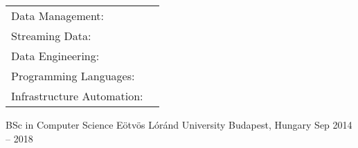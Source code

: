 \documentclass[]{awesome-cv}
\begin{document}
\begin{cventries}
	\cventry
	{}
	{\def\arraystretch{1.15}{\begin{tabular}{ l l }
		Data Management: & {\skill{ Snowflake, BigQuery, Redshift, SQL, DuckDB, Databricks, SQL, Data Lakes, Looker }} \\
		Streaming Data: & {\skill{ Kafka, Flink, Redpanda, Debezium, CDC, Materialize }} \\
		Data Engineering: & {\skill{ dbt, Airflow, Dagster, Fivetran, Meltano }} \\
		Programming Languages: & {\skill { Python, Go, Shell Scripting }} \\
		Infrastructure Automation: & {\skill{ GCP, AWS, Terraform, Docker, Kubernetes, CI/CD, GNU/Linux }} \\
		\end{tabular}}}
	{}
	{}
	{}
\end{cventries}

\begin{cventries}
	\cventry
	{BSc in Computer Science}
	{Eötvös Lóránd University}
	{Budapest, Hungary}
	{Sep 2014 – 2018}
	{}
\end{cventries}

\vspace{-2mm}
\ 
\end{document}
